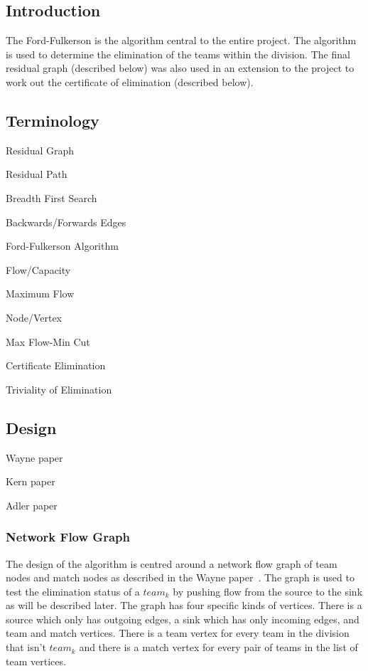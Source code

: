 \subsection{Introduction}

The Ford-Fulkerson is the algorithm central to the entire project. The
algorithm is used to determine the elimination of the teams within the
division. The final residual graph (described below) was also used in an
extension to the project to work out the certificate of elimination
(described below).

\subsection{Terminology}
Residual Graph

Residual Path

Breadth First Search

Backwards/Forwards Edges

Ford-Fulkerson Algorithm

Flow/Capacity

Maximum Flow

Node/Vertex

Max Flow-Min Cut

Certificate Elimination

Triviality of Elimination

\subsection{Design}

Wayne paper~\cite{Wayne}

Kern paper~\cite{Kern}

Adler paper~\cite{Adler}

\subsubsection{Network Flow Graph}

The design of the algorithm is centred around a network flow graph of
team nodes and match nodes as described in the Wayne
paper~\cite{Wayne}. The graph is used to test the elimination status of a
$team_k$ by pushing flow from the source to the sink as will be described 
later. The graph has four specific kinds of vertices. There is a source
which only has outgoing edges, a sink which has only incoming edges, and
team and match vertices. There is a team vertex for every team in the
division that isn't $team_k$ and there is a match vertex for every pair
of teams in the list of team vertices.


